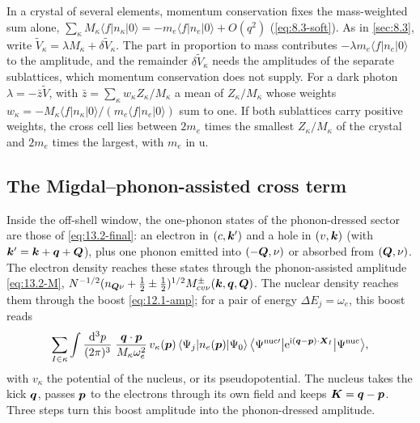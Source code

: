 In a crystal of several elements, momentum conservation fixes the mass-weighted sum alone, $\sum_\kappa M_\kappa\langle f|n_\kappa|0\rangle = -m_e\langle f|n_e|0\rangle + O(q^2)$ (\cref{eq:8.3-soft}). As in \cref{sec:8.3}, write $\tilde V_\kappa = \lambda M_\kappa + \delta\tilde V_\kappa$. The part in proportion to mass contributes $-\lambda m_e\langle f|n_e|0\rangle$ to the amplitude, and the remainder $\delta\tilde V_\kappa$ needs the amplitudes of the separate sublattices, which momentum conservation does not supply. For a dark photon $\lambda = -\bar z\tilde V$, with $\bar z = \sum_\kappa w_\kappa Z_\kappa/M_\kappa$ a mean of $Z_\kappa/M_\kappa$ whose weights $w_\kappa = -M_\kappa\langle f|n_\kappa|0\rangle/(m_e\langle f|n_e|0\rangle)$ sum to one. If both sublattices carry positive weights, the cross cell lies between $2m_e$ times the smallest $Z_\kappa/M_\kappa$ of the crystal and $2m_e$ times the largest, with $m_e$ in u.

\subsection{The Migdal--phonon-assisted cross term}\label{sec:17.4-term}

Inside the off-shell window, the one-phonon states of the phonon-dressed sector are those of \cref{eq:13.2-final}: an electron in $(c,\bm{k}')$ and a hole in $(v,\bm{k})$ (with $\bm{k}' = \bm{k} + \bm{q} + \bm{Q}$), plus one phonon emitted into $(-\bm{Q},\nu)$ or absorbed from $(\bm{Q},\nu)$. The electron density reaches these states through the phonon-assisted amplitude \cref{eq:13.2-M}, $N^{-1/2}(n_{\bm{Q}\nu} + \frac12 \pm \frac12)^{1/2}M^\pm_{cv\nu}(\bm{k},\bm{q},\bm{Q})$. The nuclear density reaches them through the boost \cref{eq:12.1-amp}; for a pair of energy $\Delta E_j = \omega_e$, this boost reads
\begin{equation*}
  \sum_{I\in\kappa}\int\frac{\mathrm{d}^3p}{(2\pi)^3}\;\frac{\bm{q}\cdot\bm{p}}{M_\kappa\omega_e^2}\,v_\kappa(\bm{p})\,\langle\Psi_j|n_e(\bm{p})|\Psi_0\rangle\,\bigl\langle\Psi^{\mathrm{nuc}\prime}\big|\mathrm{e}^{\mathrm{i}(\bm{q} - \bm{p})\cdot\bm{X}_I}\big|\Psi^{\mathrm{nuc}}\bigr\rangle ,
\end{equation*}
with $v_\kappa$ the potential of the nucleus, or its pseudopotential. The nucleus takes the kick $\bm{q}$, passes $\bm{p}$ to the electrons through its own field and keeps $\bm{K} = \bm{q} - \bm{p}$. Three steps turn this boost amplitude into the phonon-dressed amplitude.

